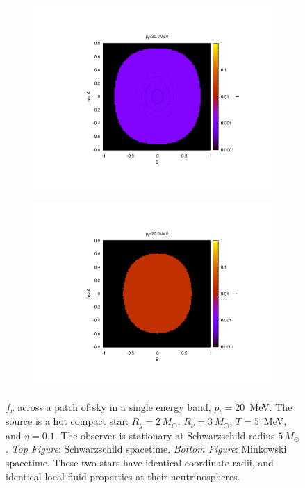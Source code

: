 \begin{figure}
  \vspace{-1cm}
  \centering
  \begin{subfigure}{.8\textwidth}
    \centering
    \includegraphics[width=1\linewidth]{Figures/fnue_Alpha_vs_Beta-asano_fukuyama_gr}
  \end{subfigure}
  \begin{subfigure}{.8\textwidth}
    \centering
    \includegraphics[width=1\linewidth]{Figures/fnue_Alpha_vs_Beta-asano_fukuyama_flat}
  \end{subfigure}
  \caption[$f_\nu$ for a hot compact star: sky map at high energy]{
    $f_\nu$ across a patch of sky in a single energy band, $p_t=20$~MeV.
    The source is a hot compact star: $R_g=2\,M_\odot$, $R_\nu=3\,M_\odot$,
    $T=5$~MeV, and $\eta=0.1$.
    The observer is stationary at Schwarzschild radius $5\,M_\odot$.
    \emph{Top Figure}: Schwarzschild spacetime.
    \emph{Bottom Figure}: Minkowski spacetime.
    These two stars have identical coordinate radii, and identical local fluid
    properties at their neutrinospheres.
  }
  \label{fig:f_hot_ns}
\end{figure}

